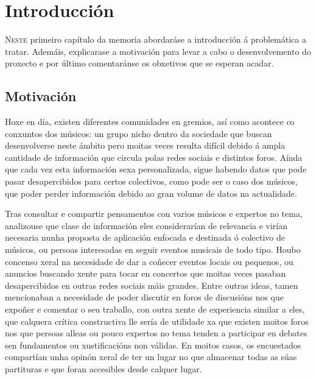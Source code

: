 \chapter{Introducción}
\label{chap:introduccion}

\lettrine{N}{este} primeiro capítulo da memoria abordaráse a introducción á problemática a tratar. Ademáis, explicarase a motivación para levar a cabo o desenvolvemento do proxecto e por último comentaránse os obxetivos que se esperan acadar.

\section{Motivación}
\label{sec:motivación}

Hoxe en día, existen diferentes comunidades en gremios, así como acontece co conxuntos dos músicos: un grupo nicho dentro da sociedade que buscan desenvolverse neste ámbito pero moitas veces resulta difícil debido á ampla cantidade de información que circula polas redes sociais e distintos foros. Aínda que cada vez esta información sexa personalizada, sigue habendo datos que pode pasar desapercibidos para certos colectivos, como pode ser o caso dos músicos, que poder perder información debido ao gran volume de datos na actualidade.

Tras consultar e compartir pensamentos con varios músicos e expertos no tema, analizouse que clase de información eles considerarían de relevancia e virían necesaria nunha proposta de aplicación enfocada e destinada ó colectivo de músicos, ou persoas interesadas en seguir eventos  musicais de todo tipo. Houbo concenso xeral na necesidade de dar a coñecer eventos locais ou pequenos, ou anuncios buscando xente para tocar en concertos que moitas veces pasaban desapercibidos en outras redes sociais máis grandes. Entre outras ideas, tamen mencionaban a necesidade de poder discutir en foros de discusións nos que expoñer e comentar o seu traballo, con outra xente de experiencia similar a eles, que calquera crítica constructiva lle sería de utilidade xa que existen moitos foros nos que persoas alleas ou pouco expertos no tema tenden a participar en debates sen fundamentos ou xustificacións non válidas.
En moitos casos, os encuestados compartían unha opinón xeral de ter un lugar no que almacenar todas as súas partituras e que foran accesibles desde calquer lugar. 

